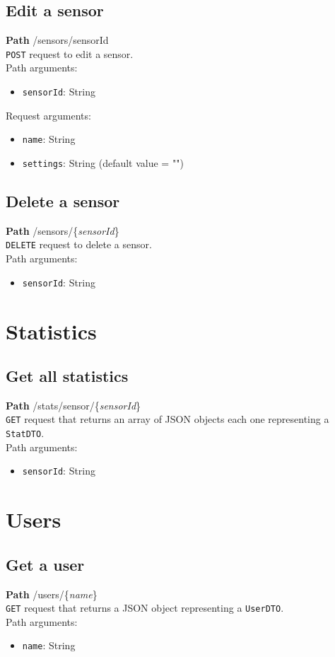\documentclass[a4paper, oneside, 11pt]{book}
\begin{document}
\subsection*{Edit a sensor}
\textbf{Path} /sensors/{sensorId} \\
\texttt{POST} request to edit a sensor. \\
Path arguments:
\begin{itemize}
    \item \texttt{sensorId}: String
\end{itemize}
Request arguments:
\begin{itemize}
	\item \texttt{name}: String
	\item \texttt{settings}: String (default value = "")
\end{itemize}

\subsection*{Delete a sensor}
\textbf{Path} /sensors/\{\textit{sensorId}\} \\
\texttt{DELETE} request to delete a sensor. \\
Path arguments:
\begin{itemize}
    \item \texttt{sensorId}: String
\end{itemize}

\section*{Statistics}
\subsection*{Get all statistics}
\textbf{Path} /stats/sensor/\{\textit{sensorId}\} \\
\texttt{GET} request that returns an array of JSON objects each one representing a \texttt{StatDTO}.\\
Path arguments:
\begin{itemize}
    \item \texttt{sensorId}: String
\end{itemize}

\section*{Users} 
\subsection*{Get a user}
\textbf{Path} /users/\{\textit{name}\} \\
\texttt{GET} request that returns a JSON object representing a \texttt{UserDTO}.\\
Path arguments:
\begin{itemize}
	\item \texttt{name}: String
\end{itemize}
\end{document}
